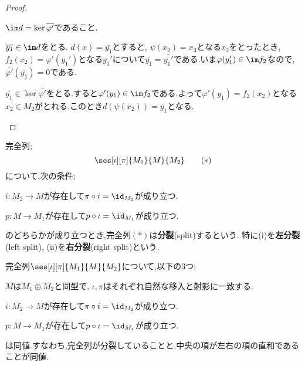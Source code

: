 \begin{proof}
\begin{step}
\begin{sakura}
			\item $\im d=\ker\bar{\varphi'}$であること.
			
			$\bar{y_1}\in\im d$をとる. $d(x)=\bar{y_1}$とすると, $\psi(x_2)=x_3$となる$x_2$をとったとき, $f_2(x_2)=\varphi'(y_1')$となる$y_1'$について$\bar{y_1}=\bar{y_1'}$である.いま$\varphi(y_1')\in\im f_2$なので, $\bar{\varphi'}(\bar{y_1})=0$である.
			
			$\bar{y_1}\in\ker\bar{\varphi'}$をとる.すると$\varphi'(y_1)\in\im f_2$である.よって$\varphi'(y_1)=f_2(x_2)$となる$x_2\in M_2$がとれる.このとき$d(\psi(x_2))=\bar{y_1}$となる.
		\end{sakura}
	\end{step}
\end{proof}

\begin{defi}[分裂完全列]
	完全列;
	\[\ses[\iota][\pi]{M_1}{M}{M_2}\tag{$\ast$}\]
	について,次の条件;
	\begin{sakura}
		\item $i:M_2\to M$が存在して$\pi\circ i=\id_{M_2}$が成り立つ.
		\item $p:M\to M_1$が存在して$p\circ\iota=\id_{M_1}$が成り立つ.
	\end{sakura}
	のどちらかが成り立つとき,完全列$(\ast)$は\textbf{分裂}(split)するという. 特に(i)を\textbf{左分裂}(left split), (ii)を\textbf{右分裂}(right split)という.
\end{defi}

\begin{lem}[分裂補題]
	完全列$\ses[\iota][\pi]{M_1}{M}{M_2}$について,以下の3つ;
	\begin{sakura}
		\item $M$は$M_1\oplus M_2$と同型で, $\iota,\pi$はそれぞれ自然な移入と射影に一致する.
			
		\item $i:M_2\to M$が存在して$\pi\circ i=\id_{M_2}$が成り立つ.
		
		\item $p:M\to M_1$が存在して$p\circ\iota=\id_{M_1}$が成り立つ.
	\end{sakura}
	は同値.すなわち,完全列が分裂していることと,中央の項が左右の項の直和であることが同値.
\end{lem}

